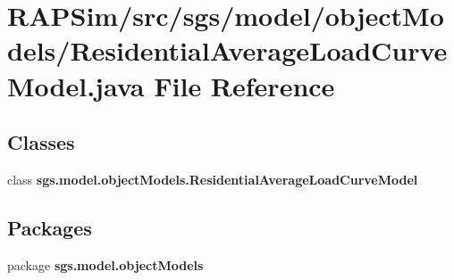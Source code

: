 \section{R\-A\-P\-Sim/src/sgs/model/object\-Models/\-Residential\-Average\-Load\-Curve\-Model.java File Reference}
\label{_residential_average_load_curve_model_8java}
\subsection*{Classes}
\begin{DoxyCompactItemize}
\item 
class {\bf sgs.\-model.\-object\-Models.\-Residential\-Average\-Load\-Curve\-Model}
\end{DoxyCompactItemize}
\subsection*{Packages}
\begin{DoxyCompactItemize}
\item 
package {\bf sgs.\-model.\-object\-Models}
\end{DoxyCompactItemize}
